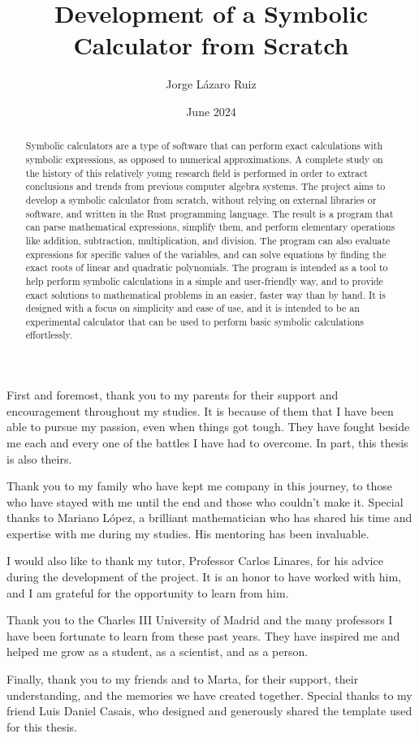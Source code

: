 \documentclass[en]{uc3mthesisIEEE}
\title{Development of a Symbolic Calculator from Scratch}
\author{Jorge Lázaro Ruiz}
\date{June 2024}
\begin{document}
  \makecover



  \begin{abstract}
    Symbolic calculators are a type of software that can perform exact calculations with symbolic expressions, as opposed to numerical approximations. A complete study on the history of this relatively young research field is performed in order to extract conclusions and trends from previous computer algebra systems. The project aims to develop a symbolic calculator from scratch, without relying on external libraries or software, and written in the Rust programming language. The result is a program that can parse mathematical expressions, simplify them, and perform elementary operations like addition, subtraction, multiplication, and division. The program can also evaluate expressions for specific values of the variables, and can solve equations by finding the exact roots of linear and quadratic polynomials. The program is intended as a tool to help perform symbolic calculations in a simple and user-friendly way, and to provide exact solutions to mathematical problems in an easier, faster way than by hand. It is designed with a focus on simplicity and ease of use, and it is intended to be an experimental calculator that can be used to perform basic symbolic calculations effortlessly.
  \end{abstract}


  \begin{acknowledgements}
    First and foremost, thank you to my parents for their support and encouragement throughout my studies. It is because of them that I have been able to pursue my passion, even when things got tough. They have fought beside me each and every one of the battles I have had to overcome. In part, this thesis is also theirs.

    Thank you to my family who have kept me company in this journey, to those who have stayed with me until the end and those who couldn't make it. Special thanks to Mariano López, a brilliant mathematician who has shared his time and expertise with me during my studies. His mentoring has been invaluable.

    I would also like to thank my tutor, Professor Carlos Linares, for his advice during the development of the project. It is an honor to have worked with him, and I am grateful for the opportunity to learn from him.

    Thank you to the Charles III University of Madrid and the many professors I have been fortunate to learn from these past years. They have inspired me and helped me grow as a student, as a scientist, and as a person.

    Finally, thank you to my friends and to Marta, for their support, their understanding, and the memories we have created together. 
    Special thanks to my friend Luis Daniel Casais, who designed and generously shared the template used for this thesis.
  \end{acknowledgements}
\end{document}
